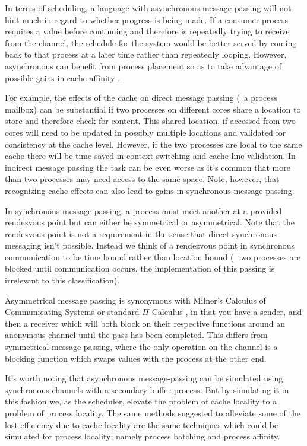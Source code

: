 In terms of scheduling, a language with asynchronous message passing will not 
hint much in regard to whether progress is being made. If a consumer process
requires a value before continuing and therefore is repeatedly trying to receive 
from the channel, the schedule for the system would be better served by coming 
back to that process at a later time rather than repeatedly looping. However,
asynchronous can benefit from process placement so as to take advantage of 
possible gains in cache affinity \cite{debattista2002cache}. 

For example, the 
effects of the cache on direct message passing (\eg~a process mailbox) can be 
substantial if two processes on different cores share a location to store and
therefore check for content. This shared location, if accessed from two cores
will need to be updated in possibly multiple locations and validated for
consistency at the cache level. However, if the two processes are local to the 
same cache there will be time saved in context switching and cache-line validation. 
In indirect message passing the task can be even worse as it's common that more
than two processes may need access to the same space. Note, however, that recognizing
cache effects can also lead to gains in synchronous message passing.

In synchronous message passing, a process must meet another at a provided 
rendezvous point but can either be symmetrical or asymmetrical. Note that the 
rendezvous point is not a requirement in the sense that direct synchronous 
messaging isn't possible. Instead we think of a rendezvous point in synchronous 
communication to be time bound rather than location bound (\ie~two processes are 
blocked until communication occurs, the implementation of this passing is 
irrelevant to this classification).

Asymmetrical message passing is synonymous with Milner's Calculus of 
Communicating Systems \cite{milner1982calculus} or standard $\Pi$-Calculus 
\cite{palamidessi1997comparing}, in that you have a sender, and then a receiver 
which will both block on their respective functions around an anonymous channel 
until the pass has been completed. This differs from symmetrical message 
passing, where the only operation on the channel is a blocking function which 
swaps values with the process at the other end.

It's worth noting that asynchronous message-passing can be simulated using 
synchronous channels with a secondary buffer process. But by simulating it in 
this fashion we, as the scheduler, elevate the problem of cache locality to a
problem of process locality. The same methods suggested to alleviate some of the 
lost efficiency due to cache locality \cite{markatos1991load,markatos1991memory}
are the same techniques which could be simulated for process locality; namely
process batching and process affinity.

